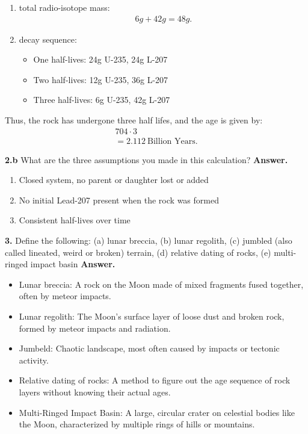 \documentclass{report}
\begin{document}
    \begin{enumerate}
        \item  total radio-isotope mass: 
            \begin{align*}
                 6g+42g = 48g
            .\end{align*}
        \item  decay sequence:
            \begin{itemize}
                \item One half-lives: 24g U-235, 24g L-207 
                \item Two half-lives: 12g U-235, 36g L-207 
                \item Three half-lives: 6g U-235, 42g L-207
            \end{itemize}
    \end{enumerate}
    Thus, the rock has undergone three half lifes, and the age is given by:
    \begin{align*}
        704 \cdot 3 \\
        =2.112\ \text{Billion Years}
    .\end{align*}

    \bigbreak \noindent 
    \textbf{2.b} What are the three assumptions you made in this calculation?
    \bigbreak \noindent 
    \textbf{Answer.}
    \begin{enumerate}
        \item Closed system, no parent or daughter lost or added
        \item No initial Lead-207 present when the rock was formed
        \item Consistent half-lives over time
    \end{enumerate}

    \pagebreak \bigbreak \noindent 
    \textbf{3. } Define the following: (a) lunar breccia, (b) lunar regolith, (c) jumbled (also called lineated, weird or broken) terrain, (d) relative dating of rocks, (e) multi-ringed impact basin
    \bigbreak \noindent 
    \textbf{Answer.}
    \begin{itemize}
        \item Lunar breccia: A rock on the Moon made of mixed fragments fused together, often by meteor impacts.
        \item Lunar regolith: The Moon's surface layer of loose dust and broken rock, formed by meteor impacts and radiation.
        \item Jumbeld: Chaotic landscape, most often caused by impacts or tectonic activity.
        \item Relative dating of rocks: A method to figure out the age sequence of rock layers without knowing their actual ages.
        \item Multi-Ringed Impact Basin: A large, circular crater on celestial bodies like the Moon, characterized by multiple rings of hills or mountains.
    \end{itemize}
\end{document}
